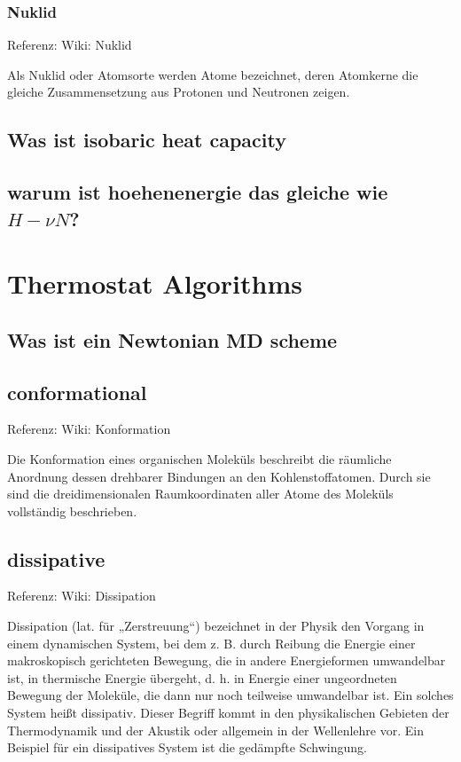 \documentclass[]{article}
\begin{document}
\subsubsection*{Nuklid}
Referenz: Wiki: Nuklid

Als Nuklid oder Atomsorte werden Atome bezeichnet, deren Atomkerne die gleiche Zusammensetzung aus Protonen und Neutronen zeigen.


\subsection{Was ist \glqq isobaric heat capacity \grqq }

\subsection{warum ist hoehenenergie das gleiche wie $H-\nu N$?}



\section{Thermostat Algorithms}

\subsection{Was ist ein \glqq Newtonian MD scheme \grqq}


\subsection{conformational}
Referenz: Wiki: Konformation

Die Konformation eines organischen Moleküls beschreibt die räumliche Anordnung dessen drehbarer Bindungen an den Kohlenstoff­atomen. Durch sie sind die dreidimensionalen Raumkoordinaten aller Atome des Moleküls vollständig beschrieben.

\subsection{dissipative}
Referenz: Wiki: Dissipation

Dissipation (lat. für „Zerstreuung“) bezeichnet in der Physik den Vorgang in einem dynamischen System, bei dem z. B. durch Reibung die Energie einer makroskopisch gerichteten Bewegung, die in andere Energieformen umwandelbar ist, in thermische Energie übergeht, d. h. in Energie einer ungeordneten Bewegung der Moleküle, die dann nur noch teilweise umwandelbar ist. Ein solches System heißt dissipativ. Dieser Begriff kommt in den physikalischen Gebieten der Thermodynamik und der Akustik oder allgemein in der Wellenlehre vor. Ein Beispiel für ein dissipatives System ist die gedämpfte Schwingung.
\end{document}
